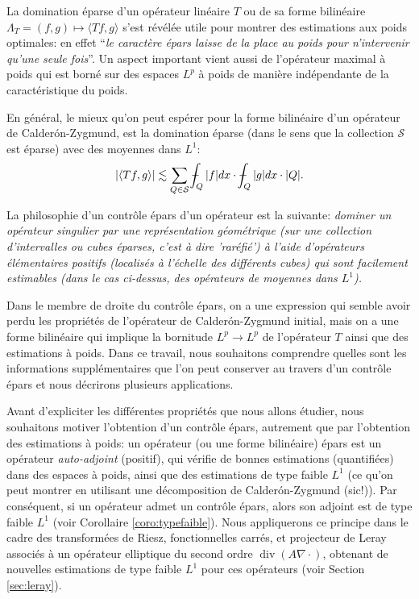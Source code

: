 \documentclass[11pt]{amsart}
\DeclareMathOperator{\dive}{div}
\newcommand{\ic}{\mathcal}
\def\Xint#1{\mathchoice
   {\XXint\displaystyle\textstyle{#1}}%
   {\XXint\textstyle\scriptstyle{#1}}%
   {\XXint\scriptstyle\scriptscriptstyle{#1}}%
   {\XXint\scriptscriptstyle\scriptscriptstyle{#1}}%
   \!\int}
\def\XXint#1#2#3{{\setbox0=\hbox{$#1{#2#3}{\int}$}
     \vcenter{\hbox{$#2#3$}}\kern-.5\wd0}}
\def\aver#1{\Xint-_{#1}}
\begin{document}
La domination \'eparse d'un op\'erateur lin\'eaire $T$ ou de sa forme bilin\'eaire $\Lambda_T= (f,g) \mapsto \langle Tf,g \rangle$ s'est r\'ev\'el\'ee utile pour montrer des estimations aux poids optimales: en effet ``{\it le caract\`ere \'epars laisse de la place au poids pour n'intervenir qu'une seule fois}''. Un aspect important vient  aussi de l'op\'erateur maximal \`a poids qui est born\'e sur des espaces $L^p$ \`a poids de mani\`ere ind\'ependante de la caract\'eristique du poids.  

En g\'en\'eral, le mieux qu'on peut esp\'erer pour la forme bilin\'eaire d'un op\'erateur de Calder\'on-Zygmund, est la domination \'eparse (dans le sens que la collection $\ic S$ est \'eparse) avec des moyennes dans $L^1$:
\begin{equation}
\vert  \langle Tf, g  \rangle \vert \lesssim  \sum_{Q \in \ic S}\aver{Q}\vert f \vert dx \cdot \aver{Q}\vert g \vert dx \cdot \vert Q \vert. \label{eq:epars}
\end{equation}

\medskip

La philosophie d'un contr\^ole \'epars d'un op\'erateur est la suivante: {\it dominer un op\'erateur singulier par une repr\'esentation g\'eom\'etrique (sur une collection d'intervalles ou cubes \'eparses, c'est \`a dire 'rar\'efi\'e') \`a l'aide d'op\'erateurs \'el\'ementaires positifs (localis\'es \`a l'\'echelle des diff\'erents cubes) qui sont facilement estimables (dans le cas ci-dessus, des op\'erateurs de moyennes dans $L^1$).}

Dans le membre de droite du contr\^ole \'epars, on a une expression qui semble avoir perdu les propri\'et\'es de l'op\'erateur de Calder\'on-Zygmund initial, mais on a une forme bilin\'eaire qui implique la bornitude $L^p \to L^p$ de l'op\'erateur $T$ ainsi que des estimations \`a poids. Dans ce travail, nous souhaitons comprendre quelles sont les informations suppl\'ementaires que l'on peut conserver au travers d'un contr\^ole \'epars et nous d\'ecrirons plusieurs applications.

\medskip

Avant d'expliciter les diff\'erentes propri\'et\'es que nous allons \'etudier, nous souhaitons motiver l'obtention d'un contr\^ole \'epars, autrement que par l'obtention des estimations \`a poids:  un op\'erateur (ou une forme bilin\'eaire) \'epars est un op\'erateur {\it auto-adjoint} (positif), qui v\'erifie de bonnes estimations (quantifi\'ees) dans des espaces \`a poids, ainsi que des estimations de type faible $L^1$ (ce qu'on peut montrer en utilisant une d\'ecomposition de Calder\'on-Zygmund (sic!)). Par cons\'equent, si un op\'erateur admet un contr\^ole \'epars, alors son adjoint est de type faible $L^1$ (voir Corollaire \ref{coro:typefaible}). Nous appliquerons ce principe dans le cadre des transform\'ees de Riesz, fonctionnelles carr\'es, et projecteur de Leray associ\'es \`a un op\'erateur elliptique du second ordre $\dive(A\nabla \cdot)$, obtenant de nouvelles estimations de type faible $L^1$ pour ces op\'erateurs (voir Section \ref{sec:leray}).
\end{document}
